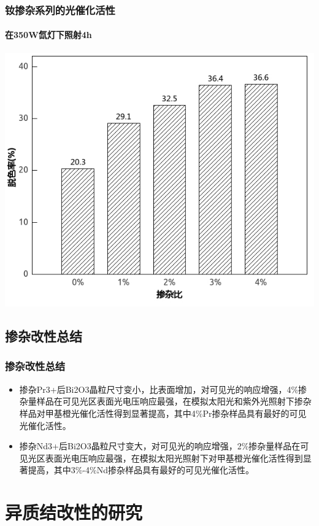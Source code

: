 \documentclass[xetex,compress]{mybeamer}
\begin{document}
\begin{frame}
\frametitle{钕掺杂系列的光催化活性}
\framesubtitle{在350W氙灯下照射4h}
\begin{block}{}
\centering
\includegraphics[scale=6]{figures/钕掺杂活性.jpg} 
\end{block}
\end{frame}

\subsection{掺杂改性总结}
\begin{frame}
\frametitle{掺杂改性总结}
\begin{block}{}
\begin{itemize}
\item<1> 掺杂Pr3+后Bi2O3晶粒尺寸变小，比表面增加，对可见光的响应增强，4\%掺杂量样品在可见光区表面光电压响应最强，在模拟太阳光和紫外光照射下掺杂样品对甲基橙光催化活性得到显著提高，其中4\%Pr掺杂样品具有最好的可见光催化活性。%
\item<2> 掺杂Nd3+后Bi2O3晶粒尺寸变大，对可见光的响应增强，2\%掺杂量样品在可见光区表面光电压响应最强，在模拟太阳光照射下对甲基橙光催化活性得到显著提高，其中3\%-4\%Nd掺杂样品具有最好的可见光催化活性。
\end{itemize}
\end{block}
\end{frame}

\section{异质结改性的研究}
\end{document}
